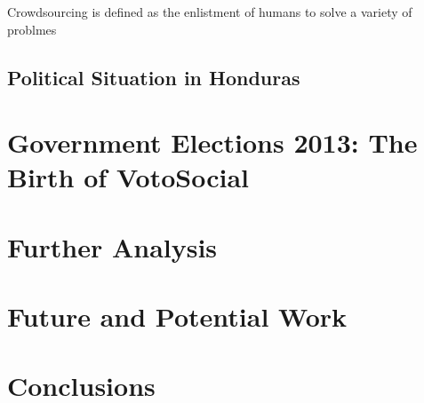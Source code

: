 \documentclass[a4paper,10pt]{article}
\begin{document}
Crowdsourcing is defined as the enlistment of humans to solve a variety of problmes \citep{doan2011}


\subsection{Political Situation in Honduras}

\section{Government Elections 2013: The Birth of VotoSocial}

\section{Further Analysis}

\section{Future and Potential Work}

\section{Conclusions}


\newpage




\end{document}
